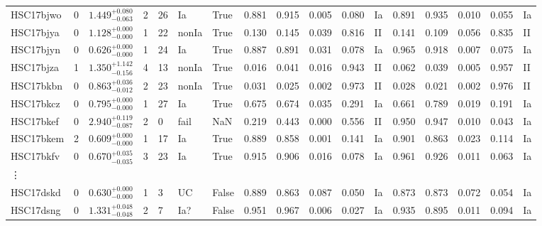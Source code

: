 \documentclass[proof]{pasj01}
\begin{document}
\begin{table}[htbp]
{\begin{tabular}{p{4.5em}p{1.2em}p{4.0em}p{2.1em}|p{0.6em}p{1.8em}p{3.0em}|p{2.9em}|p{1.2em}p{1.2em}p{1.2em}p{0.6em}|p{2.9em}|p{1.2em}p{1.2em}p{1.2em}p{0.6em}}
HSC17bjwo &     0 &    $1.449_{-0.063}^{+0.080}$ &         2 &   26 &     Ia &     True &    0.881 &    0.915 &    0.005 &    0.080 &      Ia &    0.891 &    0.935 &    0.010 &    0.055 &      Ia \\
HSC17bjya &     0 &    $1.128_{-0.000}^{+0.000}$ &         1 &   22 &  nonIa &     True &    0.130 &    0.145 &    0.039 &    0.816 &      II &    0.141 &    0.109 &    0.056 &    0.835 &      II \\
HSC17bjyn &     0 &    $0.626_{-0.000}^{+0.000}$ &         1 &   24 &     Ia &     True &    0.887 &    0.891 &    0.031 &    0.078 &      Ia &    0.965 &    0.918 &    0.007 &    0.075 &      Ia \\
HSC17bjza &     1 &    $1.350_{-0.156}^{+1.142}$ &         4 &   13 &  nonIa &     True &    0.016 &    0.041 &    0.016 &    0.943 &      II &    0.062 &    0.039 &    0.005 &    0.957 &      II \\
HSC17bkbn &     0 &    $0.863_{-0.012}^{+0.036}$ &         2 &   23 &  nonIa &     True &    0.031 &    0.025 &    0.002 &    0.973 &      II &    0.028 &    0.021 &    0.002 &    0.976 &      II \\
HSC17bkcz &     0 &    $0.795_{-0.000}^{+0.000}$ &         1 &   27 &     Ia &     True &    0.675 &    0.674 &    0.035 &    0.291 &      Ia &    0.661 &    0.789 &    0.019 &    0.191 &      Ia \\
HSC17bkef &     0 &    $2.940_{-0.087}^{+0.119}$ &         2 &    0 &   fail &    NaN &    0.219 &    0.443 &    0.000 &    0.556 &      II &    0.950 &    0.947 &    0.010 &    0.043 &      Ia \\
HSC17bkem &     2 &    $0.609_{-0.000}^{+0.000}$ &         1 &   17 &     Ia &     True &    0.889 &    0.858 &    0.001 &    0.141 &      Ia &    0.901 &    0.863 &    0.023 &    0.114 &      Ia \\
HSC17bkfv &     0 &    $0.670_{-0.035}^{+0.035}$ &         3 &   23 &     Ia &     True &    0.915 &    0.906 &    0.016 &    0.078 &      Ia &    0.961 &    0.926 &    0.011 &    0.063 &      Ia \\
\vdots & & & & & & & & & & & & & & & &\\
HSC17dskd &     0 &    $0.630_{-0.000}^{+0.000}$ &         1 &    3 &  UC &   False &    0.889 &    0.863 &    0.087 &    0.050 &      Ia &    0.873 &    0.873 &    0.072 &    0.054 &      Ia \\
HSC17dsng &     0 &    $1.331_{-0.048}^{+0.048}$ &         2 &    7 &    Ia? &   False &    0.951 &    0.967 &    0.006 &    0.027 &      Ia &    0.935 &    0.895 &    0.011 &    0.094 &      Ia \\

\end{tabular}}
\end{table}
\end{document}

